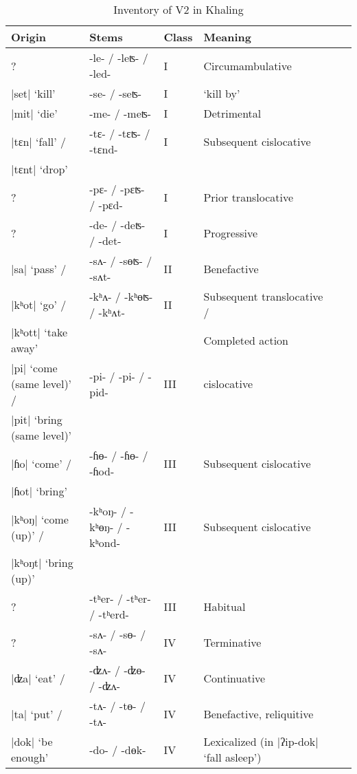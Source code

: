 \documentclass[oneside,a4paper,11pt]{article}
\newcommand{\ipa}[1]{{\phon#1}}
\newcommand{\dhatu}[2]{|\ipa{#1}| `#2'}
\begin{document}
\begin{table}[H]
\caption{Inventory of V2 in Khaling} \label{tab:khyal.v2} \centering 
\begin{tabular}{llllll}
\toprule 
Origin & Stems & Class & Meaning \\%
\midrule
?&   \ipa{-le- / -leʦ- / -led-} & I &  Circumambulative   \\
\midrule
\dhatu{set}{kill} &   \ipa{-se- / -seʦ-} & I &  `kill by'   \\
\midrule
\dhatu{mit}{die} &   \ipa{-me- / -meʦ-} & I &  Detrimental   \\
\midrule
\dhatu{tɛn}{fall} / &  \ipa{-tɛ- / -tɛʦ- / -tɛnd-} & I &  Subsequent cislocative   \\
\dhatu{tɛnt}{drop} &\\
\midrule
 ? &  \ipa{-pɛ- / -pɛʦ- / -pɛd-} & I &  Prior translocative \\
 \midrule
 ?&   \ipa{-de- / -deʦ- / -det-} & I &  Progressive   \\
 \midrule 
\dhatu{sa}{pass} / &  \ipa{-sʌ- / -sɵʦ- / -sʌt-} & II &  Benefactive \\
\midrule
\dhatu{kʰot}{go} / &  \ipa{-kʰʌ- / -kʰɵʦ- / -kʰʌt-} & II &  Subsequent translocative / \\
\dhatu{kʰott}{take away} & &&Completed action & \\
\midrule
\dhatu{pi}{come (same level)} / &  \ipa{-pi- / -pi- / -pid-} & III &  cislocative \\
\dhatu{pit}{bring (same level)} & &&  & \\
\midrule
\dhatu{ɦo}{come} / &  \ipa{-ɦɵ- / -ɦɵ- / -ɦod-} & III &  Subsequent cislocative \\
\dhatu{ɦot}{bring} & &&  & \\
\midrule
\dhatu{kʰoŋ}{come (up)} / &  \ipa{-kʰoŋ- / -kʰɵŋ- / -kʰond-} & III &  Subsequent cislocative \\
\dhatu{kʰoŋt}{bring (up)} & &&  & \\
\midrule
 ? &  \ipa{-tʰer- / -tʰer- / -tʰerd-} & III &  Habitual   \\
\midrule
 ? &   \ipa{-sʌ- / -sɵ- / -sʌ-} & IV &  Terminative   \\
 \midrule
 \dhatu{ʣa}{eat} / &  \ipa{-ʣʌ- / -ʣɵ- / -ʣʌ-} & IV &  Continuative   \\
 \midrule
  \dhatu{ta}{put} / &  \ipa{-tʌ- / -tɵ- / -tʌ-} & IV &  Benefactive, reliquitive   \\
  \midrule
\dhatu{dok}{be enough} &   \ipa{-do- / -dɵk-} & IV &  Lexicalized (in \dhatu{ʔip-dok}{fall asleep})  \\
\bottomrule 
\end{tabular}
\end{table}
\end{document}
